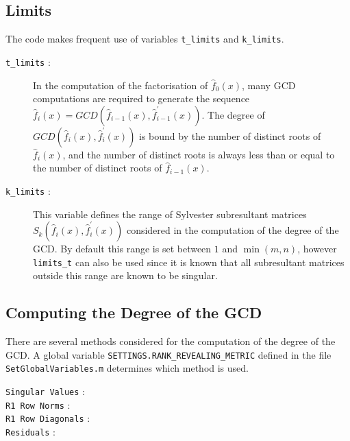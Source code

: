 \documentclass{article}
\begin{document}
\subsection{Limits}
The code makes frequent use of variables \texttt{t\_limits} and \texttt{k\_limits}. 
\begin{description}

	\item[\texttt{t\_limits} : ] In the computation of the factorisation of $\hat{f}_{0}(x)$, many \gls{GCD} computations are required to generate the sequence 
	$
		\hat{f}_{i}(x)
		=
		GCD
		\left(
			\hat{f}_{i-1}(x)
			,
			\hat{f}_{i-1}^{'}(x)
		\right)
	$. The degree of
	$
		GCD
		\left(
			\hat{f}_{i}(x)
			,
			\hat{f}_{i}^{'}(x)
		\right)
	$ is bound by the number of distinct roots of $\hat{f}_{i}(x)$, and the number of distinct roots is always less than or equal to the number of distinct roots of $\hat{f}_{i-1}(x)$. 
	
	\item[\texttt{k\_limits} : ] This variable defines the range of Sylvester subresultant matrices 
	$
		S_{k}
		\left(
			\hat{f}_{i}(x)
			,
			\hat{f}_{i}^{'}(x)
		\right)
	$ considered in the computation of the degree of the \gls{GCD}. By default this range is set between $1$ and $\min(m,n)$, however \texttt{limits\_t} can also be used since it is known that all subresultant matrices outside this range are known to be singular. 
\end{description}

\subsection{Computing the Degree of the GCD}
There are several methods considered for the computation of the degree of the \gls{GCD}. A global variable \texttt{SETTINGS.RANK\_REVEALING\_METRIC} defined in the file \texttt{SetGlobalVariables.m} determines which method is used.

\begin{description}
	
	\item[\texttt{Singular Values} : ] 
	
	\item[\texttt{R1 Row Norms} :]
	
	\item[\texttt{R1 Row Diagonals} : ]
	
	\item[\texttt{Residuals} : ]
	
\end{description}
\end{document}
